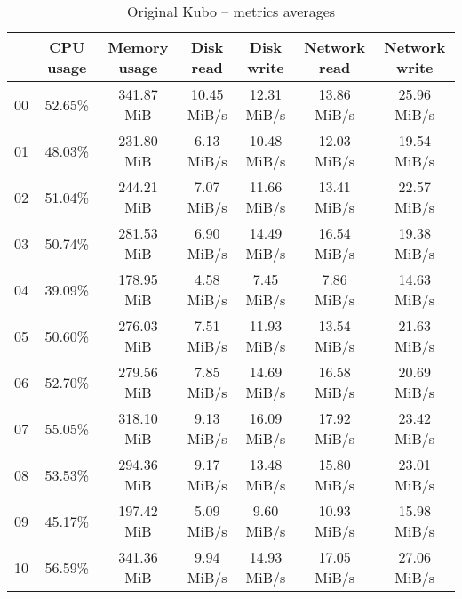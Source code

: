\begin{table}[H]
\begin{center}
\caption{Original Kubo -- metrics averages}
\label{tab:original-avg}
\begin{tabular}{|c|c|c|c|c|c|c|}
\hline
   & CPU usage & Memory usage & Disk read & Disk write & Network read & Network write\\
\hline
00 & 52.65\% & 341.87 MiB & 10.45 MiB/s & 12.31 MiB/s & 13.86 MiB/s & 25.96 MiB/s\\
01 & 48.03\% & 231.80 MiB & 6.13 MiB/s & 10.48 MiB/s & 12.03 MiB/s & 19.54 MiB/s\\
02 & 51.04\% & 244.21 MiB & 7.07 MiB/s & 11.66 MiB/s & 13.41 MiB/s & 22.57 MiB/s\\
03 & 50.74\% & 281.53 MiB & 6.90 MiB/s & 14.49 MiB/s & 16.54 MiB/s & 19.38 MiB/s\\
04 & 39.09\% & 178.95 MiB & 4.58 MiB/s & 7.45 MiB/s & 7.86 MiB/s & 14.63 MiB/s\\
05 & 50.60\% & 276.03 MiB & 7.51 MiB/s & 11.93 MiB/s & 13.54 MiB/s & 21.63 MiB/s\\
06 & 52.70\% & 279.56 MiB & 7.85 MiB/s & 14.69 MiB/s & 16.58 MiB/s & 20.69 MiB/s\\
07 & 55.05\% & 318.10 MiB & 9.13 MiB/s & 16.09 MiB/s & 17.92 MiB/s & 23.42 MiB/s\\
08 & 53.53\% & 294.36 MiB & 9.17 MiB/s & 13.48 MiB/s & 15.80 MiB/s & 23.01 MiB/s\\
09 & 45.17\% & 197.42 MiB & 5.09 MiB/s & 9.60 MiB/s & 10.93 MiB/s & 15.98 MiB/s\\
10 & 56.59\% & 341.36 MiB & 9.94 MiB/s & 14.93 MiB/s & 17.05 MiB/s & 27.06 MiB/s\\
\hline
\end{tabular}
\end{center}
\end{table}
